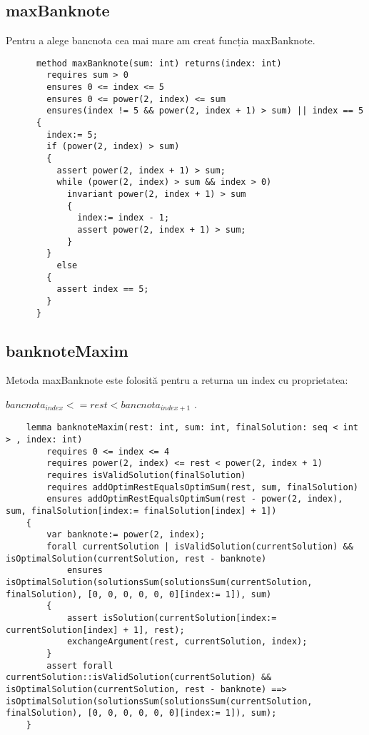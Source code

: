     \subsection{maxBanknote}
    Pentru a alege bancnota cea mai mare am creat funcția maxBanknote.\par
    \begin{lstlisting}
      method maxBanknote(sum: int) returns(index: int)
        requires sum > 0
        ensures 0 <= index <= 5
        ensures 0 <= power(2, index) <= sum
        ensures(index != 5 && power(2, index + 1) > sum) || index == 5 
      {
        index:= 5;
        if (power(2, index) > sum) 
        {
          assert power(2, index + 1) > sum;
          while (power(2, index) > sum && index > 0)
            invariant power(2, index + 1) > sum 
            {
              index:= index - 1;
              assert power(2, index + 1) > sum;
            }
        } 
          else 
        {
          assert index == 5;
        }
      }
    \end{lstlisting}


    \subsection{banknoteMaxim}
    Metoda maxBanknote este folosită pentru a returna un index cu proprietatea: \par
     $bancnota_{index} <= rest < bancnota_{index + 1}$  .
    \begin{lstlisting}
    lemma banknoteMaxim(rest: int, sum: int, finalSolution: seq < int > , index: int)
        requires 0 <= index <= 4
        requires power(2, index) <= rest < power(2, index + 1)
        requires isValidSolution(finalSolution)
        requires addOptimRestEqualsOptimSum(rest, sum, finalSolution)
        ensures addOptimRestEqualsOptimSum(rest - power(2, index), sum, finalSolution[index:= finalSolution[index] + 1]) 
    {
        var banknote:= power(2, index);
        forall currentSolution | isValidSolution(currentSolution) && isOptimalSolution(currentSolution, rest - banknote)
            ensures isOptimalSolution(solutionsSum(solutionsSum(currentSolution, finalSolution), [0, 0, 0, 0, 0, 0][index:= 1]), sum) 
        {
            assert isSolution(currentSolution[index:= currentSolution[index] + 1], rest);
            exchangeArgument(rest, currentSolution, index);
        }
        assert forall currentSolution::isValidSolution(currentSolution) && isOptimalSolution(currentSolution, rest - banknote) ==> isOptimalSolution(solutionsSum(solutionsSum(currentSolution, finalSolution), [0, 0, 0, 0, 0, 0][index:= 1]), sum);
    }
    \end{lstlisting}

